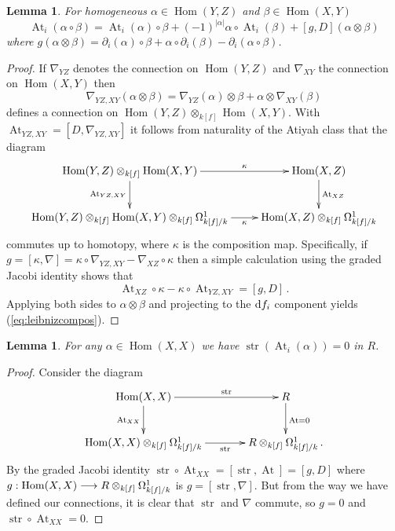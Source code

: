 \documentclass{compositio}
\newtheorem{lemma}[theorem]{Lemma}
\theoremstyle{definition}
\numberwithin{equation}{section}
\def\Hom{\operatorname{Hom}}
\DeclareMathOperator{\str}{str}
\DeclareMathOperator{\At}{At}
\begin{document}
\begin{lemma}\label{lemma:leibnizatiyah} For homogeneous $\alpha \in \Hom(Y,Z)$ and $\beta \in \Hom(X,Y)$
\begin{equation}\label{eq:leibnizcompos}
\At_i( \alpha \circ \beta ) = \At_i(\alpha) \circ \beta + (-1)^{|\alpha|} \alpha \circ \At_i(\beta) + [g,D]( \alpha \otimes \beta)
\end{equation}
where $g( \alpha \otimes \beta ) = \partial_i(\alpha) \circ \beta + \alpha \circ \partial_i(\beta) - \partial_i( \alpha \circ \beta )$.
\end{lemma}
\begin{proof}
If $\nabla_{YZ}$ denotes the connection on $\Hom(Y,Z)$ and $\nabla_{XY}$ the connection on $\Hom(X,Y)$ then
\[
\nabla_{YZ,XY}(\alpha \otimes \beta) = \nabla_{YZ}(\alpha) \otimes \beta + \alpha \otimes \nabla_{XY}(\beta)
\]
defines a connection on $\Hom(Y,Z) \otimes_{k[f]} \Hom(X,Y)$. With $\At_{YZ,XY} = [D, \nabla_{YZ,XY}]$ it follows from naturality of the Atiyah class \cite{??} that the diagram
\[
\xymatrix{
\Hom(Y,Z) \otimes_{k[f]} \Hom(X,Y) \ar[d]_{\At_{YZ,XY}}\ar[r]^-{\kappa} & \Hom(X,Z) \ar[d]^{\At_{XZ}}\\
\Hom(Y,Z) \otimes_{k[f]} \Hom(X,Y) \otimes_{k[f]} \Omega^1_{k[f]/k} \ar[r]_-{\kappa} & \Hom(X,Z) \otimes_{k[f]} \Omega^1_{k[f]/k}
}
\]
commutes up to homotopy, where $\kappa$ is the composition map. Specifically, if $g = [\kappa, \nabla] = \kappa \circ \nabla_{YZ,XY} - \nabla_{XZ} \circ \kappa$ then a simple calculation using the graded Jacobi identity shows that
\[
\At_{XZ} \circ \kappa - \kappa \circ \At_{YZ,XY} = [g,D]\,.
\]
Applying both sides to $\alpha \otimes \beta$ and projecting to the $\mathrm{d} f_i$ component yields (\ref{eq:leibnizcompos}).
\end{proof}

\begin{lemma}\label{lemma:stratiyahzero} For any $\alpha \in \Hom(X,X)$ we have $\str( \At_i( \alpha ) ) = 0$ in $R$.
\end{lemma}
\begin{proof}
Consider the diagram
\[
\xymatrix@C+1pc{
\Hom(X,X) \ar[d]_{\At_{XX}} \ar[r]^-{\str} & R \ar[d]^{\At = 0}\\
\Hom(X,X) \otimes_{k[f]} \Omega^1_{k[f]/k} \ar[r]_-{\str} & R \otimes_{k[f]} \Omega^1_{k[f]/k}\,.
}
\]
By the graded Jacobi identity $\str \circ \At_{XX} = [\str, \At] = [g,D]$ where $g: \Hom(X,X) \lto R \otimes_{k[f]} \Omega^1_{k[f]/k}$ is $g = [\str, \nabla]$. But from the way we have defined our connections, it is clear that $\str$ and $\nabla$ commute, so $g = 0$ and $\str \circ \At_{XX} = 0$.
\end{proof}
\end{document}
